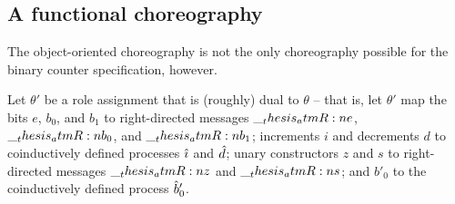 \subsection{A functional choreography}\label{sec:formula-as-process:counters-functional}

The object-oriented choreography is not the only choreography possible for the binary counter specification, however.

Let $\theta'$ be%
a role assignment that is (roughly) dual to $\theta$ -- that is, let $\theta'$ map the bits $e$, $b_0$, and $b_1$ to right-directed messages $\__thesis_atmR:n {e}$, $\__thesis_atmR:n {b}_0$, and $\__thesis_atmR:n {b}_1$; increments $i$ and decrements $d$ to coinductively defined processes $\hat{\imath}$ and $\hat{d}$; unary constructors $z$ and $s$ to right-directed messages $\__thesis_atmR:n {z}$ and $\__thesis_atmR:n {s}$; and $b'_0$ to the coinductively defined process $\hat{b}'_0$.%


